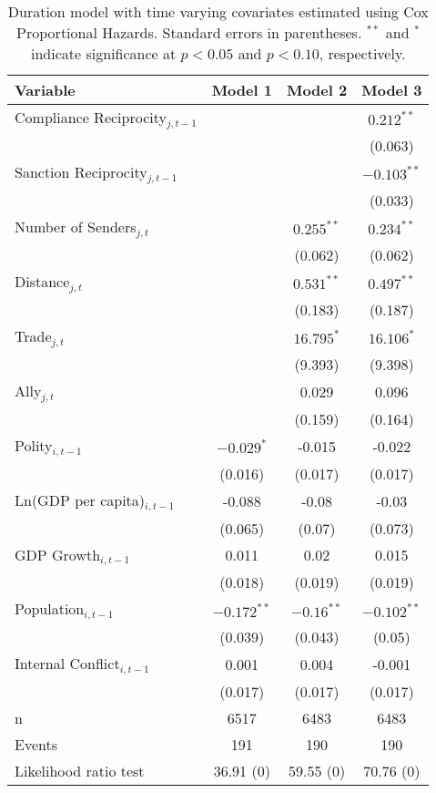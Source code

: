\begin{table}[ht]
\centering
{\normalsize
\begin{tabular}{lccc}
 Variable & Model 1 & Model 2 & Model 3 \\ 
  \hline
\hline
Compliance Reciprocity$_{j,t-1}$ &  &  & $0.212^{\ast\ast}$ \\ 
   &  &  & (0.063) \\ 
  Sanction Reciprocity$_{j,t-1}$ &  &  & $-0.103^{\ast\ast}$ \\ 
   &  &  & (0.033) \\ 
   \hline
Number of Senders$_{j,t}$ &  & $0.255^{\ast\ast}$ & $0.234^{\ast\ast}$ \\ 
   &  & (0.062) & (0.062) \\ 
  Distance$_{j,t}$ &  & $0.531^{\ast\ast}$ & $0.497^{\ast\ast}$ \\ 
   &  & (0.183) & (0.187) \\ 
  Trade$_{j,t}$ &  & $16.795^{\ast}$ & $16.106^{\ast}$ \\ 
   &  & (9.393) & (9.398) \\ 
  Ally$_{j,t}$ &  & 0.029 & 0.096 \\ 
   &  & (0.159) & (0.164) \\ 
   \hline
Polity$_{i,t-1}$ & $-0.029^{\ast}$ & -0.015 & -0.022 \\ 
   & (0.016) & (0.017) & (0.017) \\ 
  Ln(GDP per capita)$_{i,t-1}$ & -0.088 & -0.08 & -0.03 \\ 
   & (0.065) & (0.07) & (0.073) \\ 
  GDP Growth$_{i,t-1}$ & 0.011 & 0.02 & 0.015 \\ 
   & (0.018) & (0.019) & (0.019) \\ 
  Population$_{i,t-1}$ & $-0.172^{\ast\ast}$ & $-0.16^{\ast\ast}$ & $-0.102^{\ast\ast}$ \\ 
   & (0.039) & (0.043) & (0.05) \\ 
  Internal Conflict$_{i,t-1}$ & 0.001 & 0.004 & -0.001 \\ 
   & (0.017) & (0.017) & (0.017) \\ 
   \hline
n & 6517 & 6483 & 6483 \\ 
  Events & 191 & 190 & 190 \\ 
  Likelihood ratio test & 36.91 (0) & 59.55 (0) & 70.76 (0) \\ 
   \hline
\hline
\end{tabular}
}
\caption{Duration model with time varying covariates estimated using Cox Proportional Hazards. Standard errors in parentheses. $^{**}$ and $^{*}$ indicate significance at $p< 0.05 $ and $p< 0.10 $, respectively.} 
\label{tab:regResults}
\end{table}
